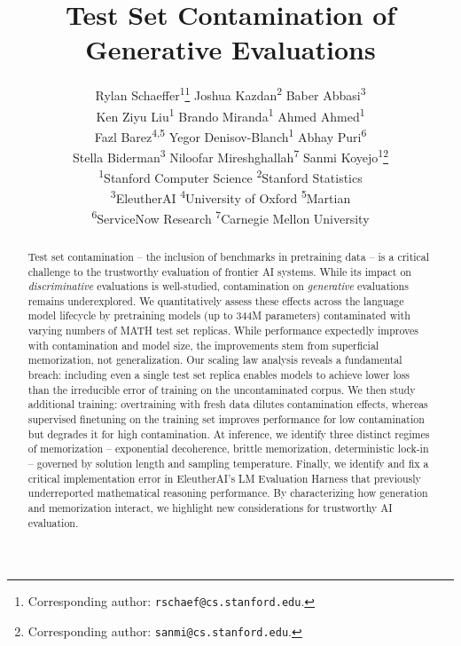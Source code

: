 \documentclass{article}
\title{Test Set Contamination of Generative Evaluations}
\author{%
  \parbox{\dimexpr\textwidth-2\tabcolsep\relax}{\centering
    Rylan Schaeffer\textsuperscript{1}\thanks{Corresponding author: \texttt{rschaef@cs.stanford.edu}.}\quad
    Joshua Kazdan\textsuperscript{2}\quad
    Baber Abbasi\textsuperscript{3}\\[3pt]
    Ken Ziyu Liu\textsuperscript{1}\quad
    Brando Miranda\textsuperscript{1}\quad
    Ahmed Ahmed\textsuperscript{1}\\[3pt]
    Fazl Barez\textsuperscript{4,5}\quad
    Yegor Denisov-Blanch\textsuperscript{1}\quad
    Abhay Puri\textsuperscript{6}\\[3pt]
    Stella Biderman\textsuperscript{3}\quad
    Niloofar Mireshghallah\textsuperscript{7}\quad
    Sanmi Koyejo\textsuperscript{1}\thanks{Corresponding author: \texttt{sanmi@cs.stanford.edu}.}\\[7pt]
    {\normalfont\small
      \textsuperscript{1}Stanford Computer Science\quad
      \textsuperscript{2}Stanford Statistics\\
      \textsuperscript{3}EleutherAI\quad
      \textsuperscript{4}University of Oxford\quad
      \textsuperscript{5}Martian\\
      \textsuperscript{6}ServiceNow Research\quad
      \textsuperscript{7}Carnegie Mellon University
    }
  }
}
\theoremstyle{plain}
\theoremstyle{definition}
\theoremstyle{remark}
\begin{document}
\maketitle


\begin{abstract}
    Test set contamination -- the inclusion of benchmarks in pretraining data -- is a critical challenge to the trustworthy evaluation of frontier AI systems.
    While its impact on \emph{discriminative} evaluations is well-studied, contamination on \emph{generative} evaluations remains underexplored.
    We quantitatively assess these effects across the language model lifecycle by pretraining models (up to 344M parameters) contaminated with varying numbers of MATH test set replicas.
    While performance expectedly improves with contamination and model size, the improvements stem from superficial memorization, not generalization.
    Our scaling law analysis reveals a fundamental breach: including even a single test set replica enables models to achieve lower loss than the irreducible error of training on the uncontaminated corpus.
    We then study additional training: overtraining with fresh data dilutes contamination effects, whereas supervised finetuning on the training set improves performance for low contamination but degrades it for high contamination.
    At inference, we identify three distinct regimes of memorization -- exponential decoherence, brittle memorization, deterministic lock-in -- governed by solution length and sampling temperature.
    Finally, we identify and fix a critical implementation error in EleutherAI's LM Evaluation Harness that previously underreported mathematical reasoning performance. By characterizing how generation and memorization interact, we highlight new considerations for trustworthy AI evaluation.
\end{abstract}












\clearpage





\appendix


\end{document}
